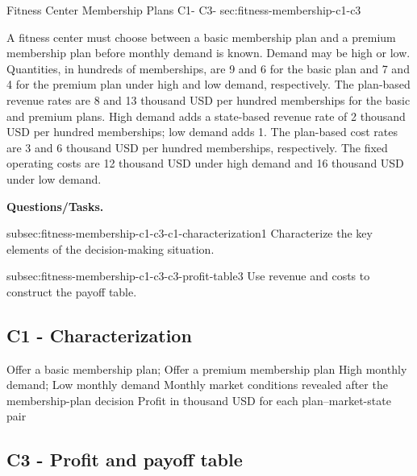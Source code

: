 	\sectionScored
	{Fitness Center Membership Plans}
	{C1- \hspace{2mm} C3-}
	{sec:fitness-membership-c1-c3}
	{
		A fitness center must choose between a basic membership plan and a
		premium membership plan before monthly demand is known. Demand may be
		high or low. Quantities, in hundreds of memberships, are 9 and 6
		for the basic plan and 7 and 4 for the premium plan under high and
		low demand, respectively. The plan-based revenue rates are 8 and 13
		thousand USD per hundred memberships for the basic and premium
		plans. High demand adds a state-based revenue rate of 2 thousand USD
		per hundred memberships; low demand adds 1. The plan-based cost rates
		are 3 and 6 thousand USD per hundred memberships, respectively. The
		fixed operating costs are 12 thousand USD under high demand and
		16 thousand USD under low demand.
		
		\textbf{Questions/Tasks.}
		\begin{enumerate}
			\CriterionTask
			{subsec:fitness-membership-c1-c3-c1-characterization}{1}
			{Characterize the key elements of the decision-making situation. }
			
			\CriterionTask
			{subsec:fitness-membership-c1-c3-c3-profit-table}{3}
			{Use revenue and costs to construct the payoff table. }
		\end{enumerate}
		
		\label{subsec:fitness-membership-c1-c3-c1-characterization}
		\subsection*{C1 - Characterization }
		
		\DecisionElementsTable
		{Offer a basic membership plan; Offer a premium membership plan}
		{High monthly demand; Low monthly demand}
		{Monthly market conditions revealed after the membership-plan decision}
		{Profit in thousand USD for each plan--market-state pair}
		
		\label{subsec:fitness-membership-c1-c3-c3-profit-table}
		\subsection*{C3 - Profit and payoff table }
		
		
}
